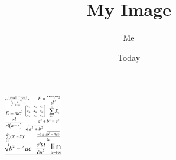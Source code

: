 \documentclass{article}
\title{My Image}
\author{Me}
\date{Today}
\begin{document}
\maketitle
\begin{figure}
\centering
\includegraphics[width=100px,height=100px]{../data/input.png}
\end{figure}
\end{document}

